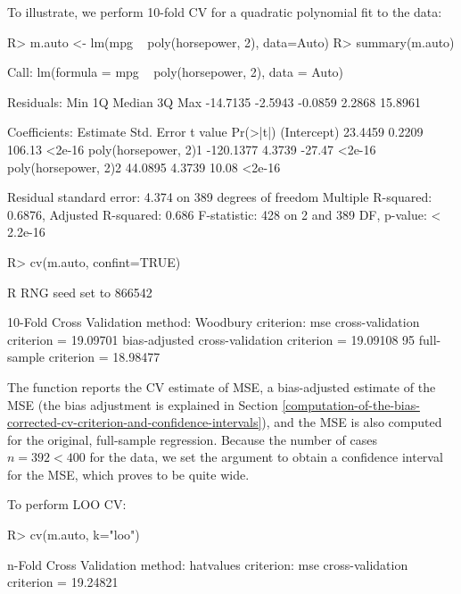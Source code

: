 \documentclass[
]{jss}
\begin{document}
To illustrate, we perform 10-fold CV for a quadratic polynomial fit to
the  data:

\begin{CodeChunk}
\begin{CodeInput}
R> m.auto <- lm(mpg ~ poly(horsepower, 2), data=Auto)
R> summary(m.auto)
\end{CodeInput}
\begin{CodeOutput}

Call:
lm(formula = mpg ~ poly(horsepower, 2), data = Auto)

Residuals:
     Min       1Q   Median       3Q      Max 
-14.7135  -2.5943  -0.0859   2.2868  15.8961 

Coefficients:
                      Estimate Std. Error t value Pr(>|t|)
(Intercept)            23.4459     0.2209  106.13   <2e-16
poly(horsepower, 2)1 -120.1377     4.3739  -27.47   <2e-16
poly(horsepower, 2)2   44.0895     4.3739   10.08   <2e-16

Residual standard error: 4.374 on 389 degrees of freedom
Multiple R-squared:  0.6876,    Adjusted R-squared:  0.686 
F-statistic:   428 on 2 and 389 DF,  p-value: < 2.2e-16
\end{CodeOutput}
\begin{CodeInput}
R> cv(m.auto, confint=TRUE)
\end{CodeInput}
\begin{CodeOutput}
R RNG seed set to 866542
\end{CodeOutput}
\begin{CodeOutput}
10-Fold Cross Validation
method: Woodbury
criterion: mse
cross-validation criterion = 19.09701
bias-adjusted cross-validation criterion = 19.09108
95%
full-sample criterion = 18.98477 
\end{CodeOutput}
\end{CodeChunk}

The function reports the CV estimate of MSE, a bias-adjusted estimate of
the MSE (the bias adjustment is explained in Section
\ref{computation-of-the-bias-corrected-cv-criterion-and-confidence-intervals}),
and the MSE is also computed for the original, full-sample regression.
Because the number of cases \(n = 392 < 400\) for the  data,
we set the argument  to obtain a confidence interval
for the MSE, which proves to be quite wide.

To perform LOO CV:

\begin{CodeChunk}
\begin{CodeInput}
R> cv(m.auto, k="loo")
\end{CodeInput}
\begin{CodeOutput}
n-Fold Cross Validation
method: hatvalues
criterion: mse
cross-validation criterion = 19.24821
\end{CodeOutput}
\end{CodeChunk}
\end{document}
